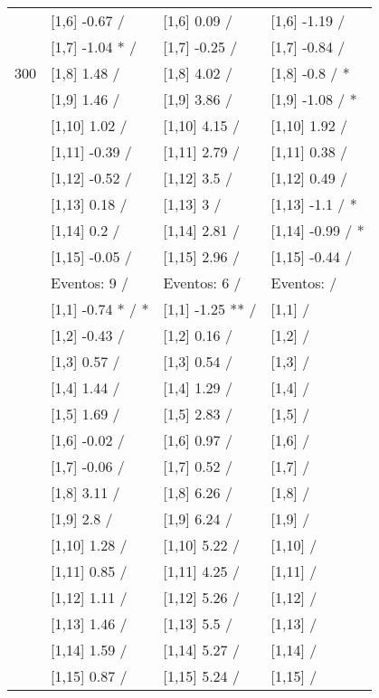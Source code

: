 \begin{table}
\begin{tabular}[t]{llll}
 & {}[1,6] -0.67  / & {}[1,6] 0.09  / & {}[1,6] -1.19  /\\
 & {}[1,7] -1.04 * / & {}[1,7] -0.25  / & {}[1,7] -0.84  /\\
300 & {}[1,8] 1.48  / & {}[1,8] 4.02  / & {}[1,8] -0.8  / *\\
\addlinespace
 & {}[1,9] 1.46  / & {}[1,9] 3.86  / & {}[1,9] -1.08  / *\\
 & {}[1,10] 1.02  / & {}[1,10] 4.15  / & {}[1,10] 1.92  /\\
 & {}[1,11] -0.39  / & {}[1,11] 2.79  / & {}[1,11] 0.38  /\\
 & {}[1,12] -0.52  / & {}[1,12] 3.5  / & {}[1,12] 0.49  /\\
 & {}[1,13] 0.18  / & {}[1,13] 3  / & {}[1,13] -1.1  / *\\
\addlinespace
 & {}[1,14] 0.2  / & {}[1,14] 2.81  / & {}[1,14] -0.99  / *\\
 & {}[1,15] -0.05  / & {}[1,15] 2.96  / & {}[1,15] -0.44  /\\
 & Eventos:  9 / & Eventos:  6 / & Eventos:   /\\
 & {}[1,1] -0.74 * / * & {}[1,1] -1.25 ** / & {}[1,1]  /\\
 & {}[1,2] -0.43  / & {}[1,2] 0.16  / & {}[1,2]  /\\
\addlinespace
 & {}[1,3] 0.57  / & {}[1,3] 0.54  / & {}[1,3]  /\\
 & {}[1,4] 1.44  / & {}[1,4] 1.29  / & {}[1,4]  /\\
 & {}[1,5] 1.69  / & {}[1,5] 2.83  / & {}[1,5]  /\\
 & {}[1,6] -0.02  / & {}[1,6] 0.97  / & {}[1,6]  /\\
 & {}[1,7] -0.06  / & {}[1,7] 0.52  / & {}[1,7]  /\\
\addlinespace
500 & {}[1,8] 3.11  / & {}[1,8] 6.26  / & {}[1,8]  /\\
 & {}[1,9] 2.8  / & {}[1,9] 6.24  / & {}[1,9]  /\\
 & {}[1,10] 1.28  / & {}[1,10] 5.22  / & {}[1,10]  /\\
 & {}[1,11] 0.85  / & {}[1,11] 4.25  / & {}[1,11]  /\\
 & {}[1,12] 1.11  / & {}[1,12] 5.26  / & {}[1,12]  /\\
\addlinespace
 & {}[1,13] 1.46  / & {}[1,13] 5.5  / & {}[1,13]  /\\
 & {}[1,14] 1.59  / & {}[1,14] 5.27  / & {}[1,14]  /\\
 & {}[1,15] 0.87  / & {}[1,15] 5.24  / & {}[1,15]  /\\
\bottomrule
\end{tabular}
\end{table}
